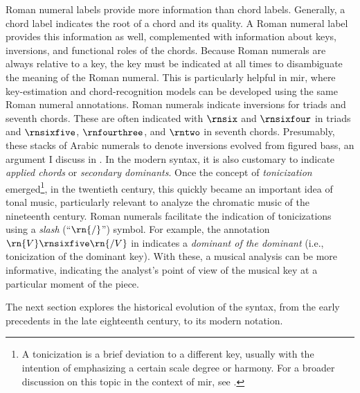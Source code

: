 

Roman numeral labels provide more information than chord
labels. Generally, a chord label indicates the root of a
chord and its quality. A Roman numeral label provides this
information as well, complemented with information about
keys, inversions, and functional roles of the chords.
Because Roman numerals are always relative to a key, the key
must be indicated at all times to disambiguate the meaning
of the Roman numeral. This is particularly helpful in
\gls{mir}, where key-estimation and chord-recognition models
can be developed using the same Roman numeral annotations.
Roman numerals indicate inversions for triads and seventh
chords. These are often indicated with $\rnsix$ and
$\rnsixfour$ in triads and $\rnsixfive$, $\rnfourthree$, and
$\rntwo$ in seventh chords. Presumably, these stacks of
Arabic numerals to denote inversions evolved from figured
bass, an argument I discuss in
. In the modern
syntax, it is also customary to indicate \emph{applied
chords} or \emph{secondary dominants}. Once the concept of
\emph{tonicization} emerged\footnote{A tonicization is a
brief deviation to a different key, usually with the
intention of emphasizing a certain scale degree or harmony.
For a broader discussion on this topic in the context of
\gls{mir}, see \textcite{napoleslopez2020local}.}, in the
twentieth century, this quickly became an important idea of
tonal music, particularly relevant to analyze the chromatic
music of the nineteenth century. Roman numerals facilitate
the indication of tonicizations using a \emph{slash}
(``$\rn{/}$'') symbol. For example, the annotation
$\rn{V}\rnsixfive\rn{/V}$ in  indicates a
\emph{dominant of the dominant} (i.e., tonicization of the dominant key). With these, a musical
analysis can be more informative, indicating the analyst's
point of view of the musical key at a particular moment of
the piece.

The next section explores the historical evolution of the
syntax, from the early precedents in the late eighteenth
century, to its modern notation.

